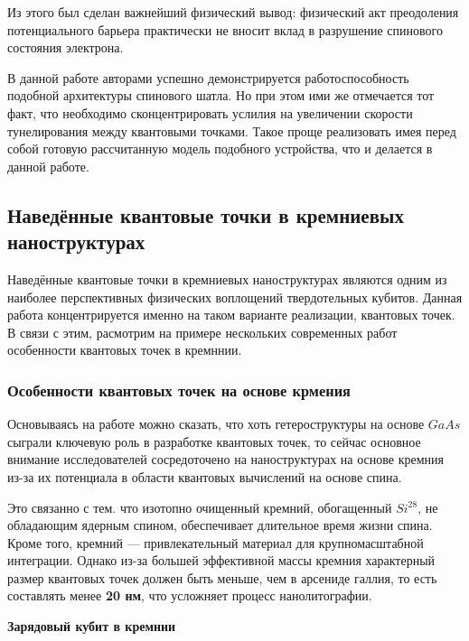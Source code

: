 \documentclass[a4paper,14pt]{extreport} %
\begin{document}
Из этого был сделан важнейший физический вывод:  физический акт преодоления потенциального барьера практически не вносит вклад в разрушение спинового состояния электрона.

В данной работе авторами успешно демонстрируется работоспособность подобной архитектуры спинового шатла. Но при этом ими же отмечается тот факт, что необходимо сконцентрировать услилия на увеличении скорости тунелирования между квантовыми точками. Такое проще реализовать имея перед собой готовую рассчитанную модель подобного устройства, что и делается в данной работе.

\subsection{Наведённые квантовые точки в кремниевых наноструктурах}
\label{ch:si_qd}

Наведённые квантовые точки в кремниевых наноструктурах являются одним из
наиболее перспективных физических воплощений твердотельных кубитов. Данная работа концентрируется 
именно на таком варианте реализации, квантовых точек. В связи с этим, расмотрим на примере 
нескольких современных работ особенности квантовых точек в кремннии.

\subsubsection{Особенности квантовых точек на основе крмения}
\label{sec:features}

Основываясь на работе \cite{Chatterjee2021} можно сказать, что хоть гетероструктуры 
на основе $GaAs$ сыграли ключевую роль в разработке квантовых точек, 
то сейчас основное внимание исследователей сосредоточено на наноструктурах на 
основе кремния из-за их потенциала в области квантовых вычислений на основе спина. 

Это связанно с тем. что изотопно очищенный кремний, обогащенный $Si^{28}$, 
не обладающим ядерным спином, обеспечивает длительное время жизни спина. Кроме того, 
кремний — привлекательный материал для крупномасштабной интеграции. Однако из-за большей 
эффективной массы кремния характерный размер квантовых точек должен быть меньше, 
чем в арсениде галлия, то есть составлять менее \textbf{20 нм}, что усложняет процесс 
нанолитографии.

\textbf{Зарядовый кубит в кремнии}
\end{document}
